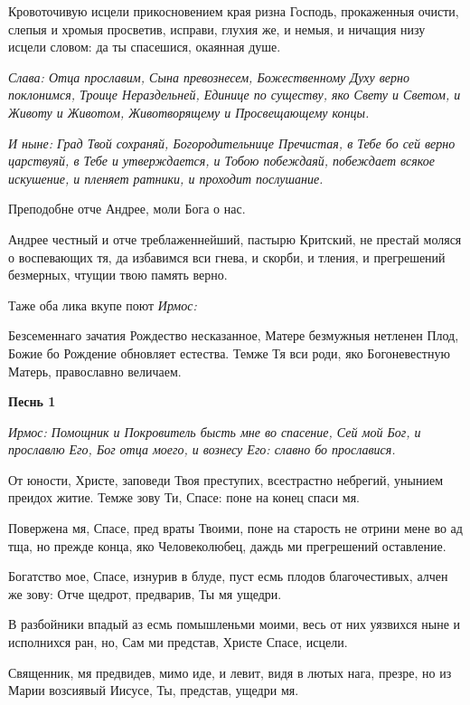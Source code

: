 Кровоточивую исцели прикосновением края ризна Господь, прокаженныя очисти, слепыя и хромыя просветив, исправи, глухия же, и немыя, и ничащия низу исцели словом: да ты спасешися, окаянная душе. 

\itshape Слава\normalfont{}: Отца прославим, Сына превознесем, Божественному Духу верно поклонимся, Троице Нераздельней, Единице по существу, яко Свету и Светом, и Животу и Животом, Животворящему и Просвещающему концы. 

\itshape И ныне\normalfont{}: Град Твой сохраняй, Богородительнице Пречистая, в Тебе бо сей верно царствуяй, в Тебе и утверждается, и Тобою побеждаяй, побеждает всякое искушение, и пленяет ратники, и проходит послушание. 

Преподобне отче Андрее, моли Бога о нас. 

Андрее честный и отче треблаженнейший, пастырю Критский, не престай моляся о воспевающих тя, да избавимся вси гнева, и скорби, и тления, и прегрешений безмерных, чтущии твою память верно. 

Таже оба лика вкупе поют \itshape Ирмос\normalfont{}: 

Безсеменнаго зачатия Рождество несказанное, Матере безмужныя нетленен Плод, Божие бо Рождение обновляет естества. Темже Тя вси роди, яко Богоневестную Матерь, православно величаем. 

\mychapterending

 
\bfseries Песнь 1\normalfont{}

\itshape Ирмос\normalfont{}: Помощник и Покровитель бысть мне во спасение, Сей мой Бог, и прославлю Его, Бог отца моего, и вознесу Его: славно бо прославися. 

От юности, Христе, заповеди Твоя преступих, всестрастно небрегий, унынием преидох житие. Темже зову Ти, Спасе: поне на конец спаси мя. 

Повержена мя, Спасе, пред враты Твоими, поне на старость не отрини мене во ад тща, но прежде конца, яко Человеколюбец, даждь ми прегрешений оставление. 

Богатство мое, Спасе, изнурив в блуде, пуст есмь плодов благочестивых, алчен же зову: Отче щедрот, предварив, Ты мя ущедри. 

В разбойники впадый аз есмь помышленьми моими, весь от них уязвихся ныне и исполнихся ран, но, Сам ми представ, Христе Спасе, исцели. 

Священник, мя предвидев, мимо иде, и левит, видя в лютых нага, презре, но из Марии возсиявый Иисусе, Ты, представ, ущедри мя. 

